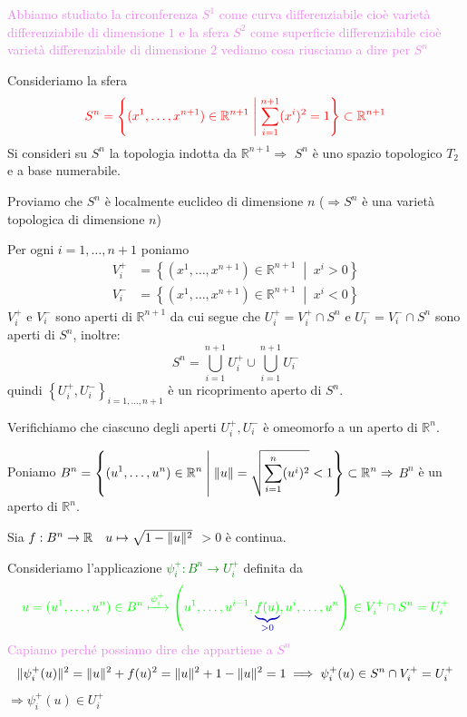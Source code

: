         \textcolor{violet}{Abbiamo studiato la circonferenza $S^1$ come curva differenziabile cioè varietà differenziabile 
        di dimensione $1$ e la sfera $S^2$ come superficie differenziabile cioè varietà differenziabile di dimensione $2$
        vediamo cosa riusciamo a dire per $S^n$}
        \begin{esempio}
        \mbox{}

        Consideriamo la sfera
        \[
        \textcolor{red}{S^n = \left\{ (x^1, \dots, x^{n+1}) \in \mathbb{R}^{n+1} \;\middle|\; \sum_{i=1}^{n+1} (x^i)^2 = 1 \right\} \subset \mathbb{R}^{n+1}}
        \]
        Si consideri su $S^n$ la topologia indotta da $\mathbb{R}^{n+1} \Rightarrow$ $S^n$ è uno spazio topologico $T_2$ e a base numerabile.

        Proviamo che $S^n$ è localmente euclideo di dimensione $n$ \textcolor{blu}{($\Rightarrow S^n$ è una varietà topologica di dimensione $n$)}

        Per ogni $i = 1, \dots, n+1$ poniamo
        \begin{align*}
        V_i^+ &= \left\{ (x^1, \dots, x^{n+1}) \in \mathbb{R}^{n+1} \;\middle|\; x^i > 0 \right\} \\
        V_i^- &= \left\{ (x^1, \dots, x^{n+1}) \in \mathbb{R}^{n+1} \;\middle|\; x^i < 0 \right\}
        \end{align*}
        $V_i^+$ e $V_i^-$ sono aperti di $\mathbb{R}^{n+1}$ da cui segue che
        $U_i^+ = V_i^+ \cap S^n  \text{ e } U_i^- = V_i^- \cap S^n$
        sono aperti di $S^n$, inoltre:
        \[
        S^n= \bigcup_{i=1}^{n+1} U_i^+ \cup \bigcup_{i=1}^{n+1} U_i^- 
        \]
        quindi $\left\{ U_i^+, U_i^- \right\}_{i=1, \dots, n+1}$ è un ricoprimento aperto di $S^n$.

        Verifichiamo che ciascuno degli aperti $U_i^+, U_i^-$ è omeomorfo a un aperto di $\mathbb{R}^n$. 

        Poniamo
        $\displaystyle B^n = \left\{ (u^1, \dots, u^n) \in \mathbb{R}^n \;\middle|\; \lVert u\rVert = \sqrt{\sum_{i=1}^n (u^i)^2} < 1 \right\} \subset \mathbb{R}^n \Rightarrow$
        $B^n$ è un aperto di $\mathbb{R}^n$. 
        
        Sia \textcolor{amber}{$f : B^n \to \mathbb{R} \quad u \mapsto \sqrt{1 - \lVert u\rVert^2}$} $>0$ è continua.
        
        Consideriamo l'applicazione \textcolor{green}{$\psi_i^+ : B^n \to U_i^+$} definita da
        \[
        \color{green} u = (u^1, \dots, u^n) \in B^n \xmapsto{\psi_i^+} \left( u^1, \dots, u^{i-1}, \textcolor{blu}{\underbrace{\textcolor{green}{f(u)}}_{>0}}, u^i, \dots, u^n \right) \in V_i^+ \cap S^n= U_i^+
        \]
        \textcolor{violet}{Capiamo perché possiamo dire che appartiene a $S^n$}
        \[
        \lVert\psi_i^+(u)\rVert^2 = \lVert u\rVert^2 + f(u)^2 = \lVert u\rVert^2 + 1 - \lVert u\rVert^2 = 1 \implies \psi_i^+(u) \in S^n \cap V_i^+ = U_i^+
        \]
        $\Rightarrow \psi_i^+(u) \in U_i^+$


\end{esempio}
